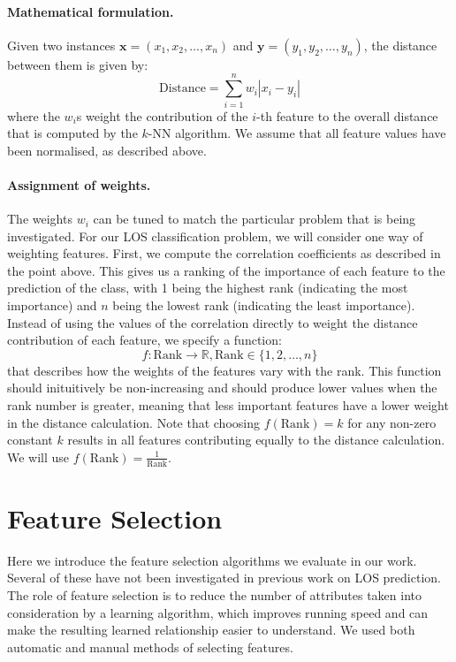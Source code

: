 \documentclass{article}
\begin{document}
\paragraph{Mathematical formulation.}
Given two instances $\mathbf{x} = (x_1,x_2,\ldots,x_n)$ and
$\mathbf{y} = (y_1,y_2,\ldots,y_n)$, the distance between them is given by:
\begin{equation*}
\mathrm{Distance} = \sum_{i=1}^n w_i |x_i-y_i|
\end{equation*}
where the $w_i$s weight the contribution of the $i$-th feature to the overall
distance that is computed by the $k$-NN algorithm. We assume that all feature
values have been normalised, as described above.

\paragraph{Assignment of weights.}
The weights $w_i$ can be tuned to match the particular problem that is being
investigated. For our LOS classification problem, we will consider one way
of weighting features.
First, we compute the correlation coefficients as described in the point above.
This gives us a ranking of the importance of each feature to the prediction of
the class, with 1 being the highest rank (indicating the most importance) and
$n$ being the lowest rank (indicating the least importance).
Instead of using the values of the correlation directly to weight
the distance contribution of each feature, we specify a function:
\begin{equation*}
f : \mathrm{Rank} \rightarrow \mathbb{R}, \mathrm{Rank} \in \{1,2,\ldots,n\}
\end{equation*}
that describes
how the weights of the features vary with the rank. This function should
inituitively be non-increasing and should produce lower values when the rank
number is greater, meaning that less important features have a lower weight
in the distance calculation.
Note that choosing $f(\mathrm{Rank}) = k$ for any non-zero constant $k$
results in all features contributing equally to the distance calculation.
We will use $f(\mathrm{Rank}) = \frac{1}{\mathrm{Rank}}$.

\section{Feature Selection}
\label{sec:features}
Here we introduce the feature selection algorithms we evaluate in our work.
Several of these have not been investigated in previous work on LOS prediction.
The role of feature selection is to reduce the number of attributes taken into
consideration by a learning algorithm, which improves running speed and can
make the resulting learned relationship easier to understand. We used both
automatic and manual methods of selecting features.
\end{document}
